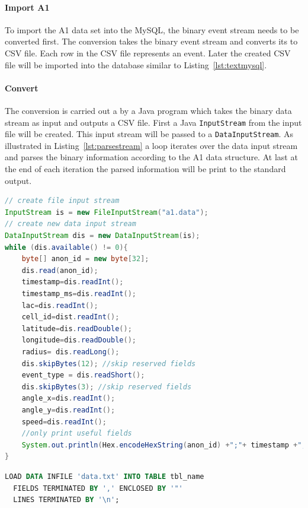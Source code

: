 \documentclass[master,english]{hgbthesis}
\begin{document}
\paragraph{Import A1}
To import the A1 data set into the MySQL, the binary event stream needs to be converted first. The conversion takes the binary event stream and converts its to CSV file. Each row in the CSV file represents an event. Later the created CSV file will be imported into the database similar to Listing~\ref{lst:textmysql}.
\paragraph{Convert}
The conversion is carried out a by a Java program which takes the binary data stream as input and outputs a CSV file. First a Java \verb|InputStream| from the input file will be created. This input stream will be passed to a \verb|DataInputStream|. As illustrated in Listing~\ref{lst:parsestream} a loop iterates over the data input stream and parses the binary information according to the A1 data structure. At last at the end of each iteration the parsed information will be print to the standard output.
\begin{lstlisting}[language=Java,style=JAVA,caption={Example code to parse event data stream},label={lst:parsestream}]
// create file input stream
InputStream is = new FileInputStream("a1.data");
// create new data input stream
DataInputStream dis = new DataInputStream(is);
while (dis.available() != 0){
    byte[] anon_id = new byte[32];
    dis.read(anon_id);
    timestamp=dis.readInt();
    timestamp_ms=dis.readInt();
    lac=dis.readInt();
    cell_id=dist.readInt();
    latitude=dis.readDouble();
    longitude=dis.readDouble();
    radius= dis.readLong();
    dis.skipBytes(12); //skip reserved fields
    event_type = dis.readShort();
    dis.skipBytes(3); //skip reserved fields
    angle_x=dis.readInt();
    angle_y=dis.readInt();
    speed=dis.readInt();
    //only print useful fields
    System.out.println(Hex.encodeHexString(anon_id) +";"+ timestamp +";"+lac +";"+cell_id +";"+latitude +";"+longitude +";"+event_type +";"+angle_x);
}
\end{lstlisting}
\begin{lstlisting}[style=htmlcssjs,language=SQL,caption={Load text file into MySQL database},label={lst:textmysql}]
LOAD DATA INFILE 'data.txt' INTO TABLE tbl_name
  FIELDS TERMINATED BY ',' ENCLOSED BY '"'
  LINES TERMINATED BY '\n';
\end{lstlisting}
\end{document}
